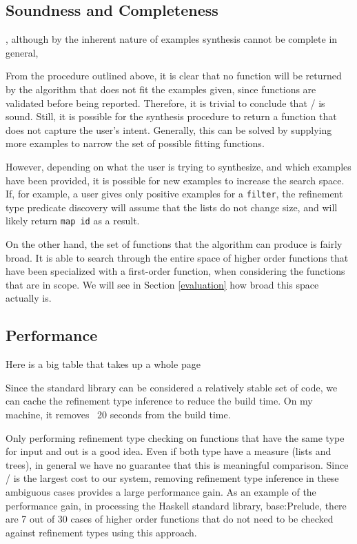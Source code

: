 \subsection{Soundness and Completeness}\label{sound}
, although by the inherent nature of examples synthesis cannot be complete in general, 

From the procedure outlined above, it is clear that no function will be returned by the algorithm that does not fit the examples given, since functions are validated before being reported. Therefore, it is trivial to conclude that \ourTool/ is sound. Still, it is possible for the synthesis procedure to return a function that does not capture the user's intent. Generally, this can be solved by supplying more examples to narrow the set of possible fitting functions.

However, depending on what the user is trying to synthesize, and which examples have been provided, it is possible for new examples to increase the search space. If, for example, a user gives only positive examples for a \texttt{filter}, the refinement type predicate discovery will assume that the lists do not change size, and will likely return \texttt{map id} as a result.

On the other hand, the set of functions that the algorithm can produce is fairly broad. It is able to search through the entire space of higher order functions that have been specialized with a first-order function, when considering the functions that are in scope. We will see in Section \ref{evaluation} how broad this space actually is. 


\subsection{Performance}

Here is a big table that takes up a whole page

Since the standard library can be considered a relatively stable set of code, we can cache the refinement type inference to reduce the build time.
On my machine, it removes ~20 seconds from the build time.


Only performing refinement type checking on functions that have the same type for input and out is a good idea. 
Even if both type have a measure (lists and trees), in general we have no guarantee that this is meaningful comparison.
Since \lhask/ is the largest cost to our system, removing refinement type inference in these ambiguous cases provides a large performance gain.
As an example of the performance gain, in processing the Haskell standard library, base:Prelude, there are 7 out of 30 cases of higher order functions that do not need to be checked against refinement types using this approach.


